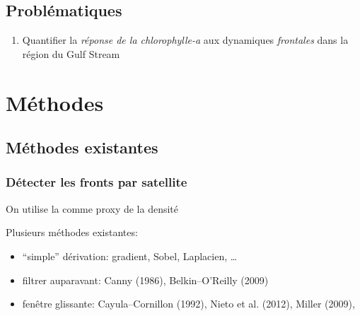 \documentclass[11pt, french, aspectratio=32]{beamer}
\begin{document}

\subsection{Problématiques}

\begin{frame}
  \vspace{2em}

  \begin{enumerate}
    \setlength{\itemsep}{1em}
    \item Quantifier la \emph{réponse de la chlorophylle-a} aux dynamiques \emph{frontales} dans la région du Gulf Stream
  \end{enumerate}
\end{frame}


\section*{Méthodes}

\begin{frame}
\end{frame}


\subsection{Méthodes existantes}

\begin{frame}
  \frametitle{Détecter les fronts par satellite}

  \begin{block}{}
    On utilise la  comme proxy de la densité
  \end{block}

  \begin{block}{}
    Plusieurs méthodes existantes:
    \begin{itemize}
            \setlength{\itemsep}{1.2em}
      \item “simple” dérivation: gradient, Sobel, Laplacien, \dots
      \item filtrer auparavant: Canny (1986), Belkin--O'Reilly (2009)
      \item fenêtre glissante: Cayula--Cornillon (1992), Nieto et al. (2012), Miller (2009), 
    \end{itemize}
  \end{block}
\end{frame}
\end{document}
